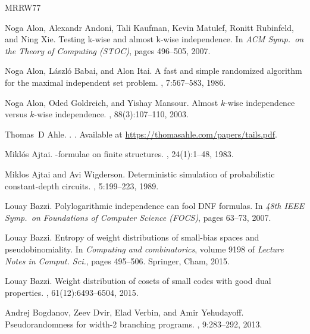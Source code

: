 \documentclass[10pt,a4paper]{article}
\theoremstyle{definition}
\begin{document}
\newcommand{\etalchar}[1]{$^{#1}$}
\def\cprime{$'$}
\begin{thebibliography}{MRRW77}

\bibitem[AAK{\etalchar{+}}07]{AlonAKMRX07}
Noga Alon, Alexandr Andoni, Tali Kaufman, Kevin Matulef, Ronitt Rubinfeld, and Ning Xie.
\newblock Testing k-wise and almost k-wise independence.
\newblock In {\em ACM Symp.~on the Theory of Computing (STOC)}, pages 496--505, 2007.

Noga Alon, L{\'a}szl{\'o} Babai, and Alon Itai.
\newblock A fast and simple randomized algorithm for the maximal independent set problem.
, 7:567--583, 1986.

Noga Alon, Oded Goldreich, and Yishay Mansour.
\newblock Almost {$k$}-wise independence versus {$k$}-wise independence.
, 88(3):107--110, 2003.

Thomas~D Ahle.
.
.
\newblock Available at \url{https://thomasahle.com/papers/tails.pdf}.

Mikl{\'o}s Ajtai.
-formulae on finite structures.
, 24(1):1--48, 1983.

Miklos Ajtai and Avi Wigderson.
\newblock Deterministic simulation of probabilistic constant-depth circuits.
, 5:199--223, 1989.

Louay Bazzi.
\newblock Polylogarithmic independence can fool {DNF} formulas.
\newblock In {\em 48th IEEE Symp.~on Foundations of Computer Science (FOCS)}, pages 63--73, 2007.

Louay Bazzi.
\newblock Entropy of weight distributions of small-bias spaces and pseudobinomiality.
\newblock In {\em Computing and combinatorics}, volume 9198 of {\em Lecture Notes in Comput. Sci.}, pages 495--506. Springer, Cham, 2015.

Louay Bazzi.
\newblock Weight distribution of cosets of small codes with good dual properties.
, 61(12):6493--6504, 2015.

Andrej Bogdanov, Zeev Dvir, Elad Verbin, and Amir Yehudayoff.
\newblock Pseudorandomness for width-2 branching programs.
, 9:283--292, 2013.


\end{thebibliography}
\end{document}
